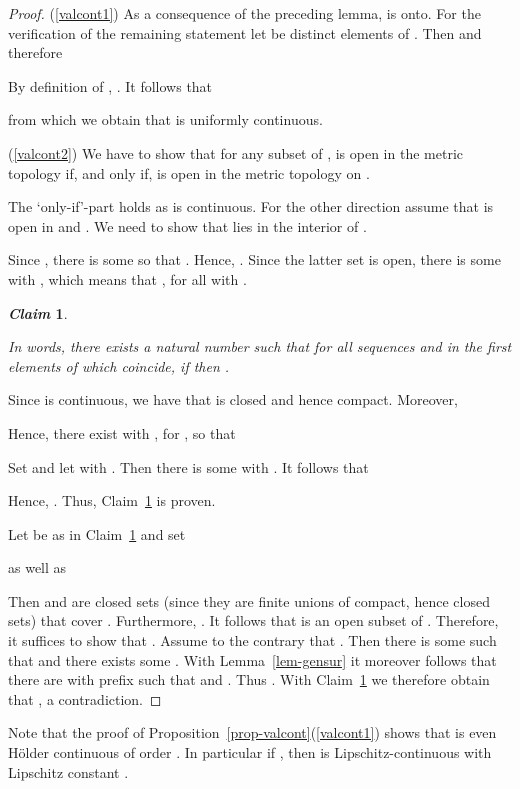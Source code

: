 \documentclass[microtype]{jloganal}
\newtheorem{claim}{\it Claim}
\theoremstyle{plain}
\theoremstyle{definition}
\begin{document}
\begin{proof}
(\ref{valcont1}) As a consequence of the preceding lemma,  is onto. For the verification of the remaining statement let  be distinct elements of . Then  and therefore 

By definition of , . It follows that

from which we obtain that  is uniformly continuous.

(\ref{valcont2}) We have to show that for any subset  of ,  is open in the metric topology if, and only if,  is open in the metric topology on . 

The `only-if'-part holds as  is continuous. For the other direction assume that  is open in  and . We need to show that  lies in the interior of .

Since , there is some  so that . Hence, . Since the latter set is open, there is some  with , which means that , for all  with .

\begin{claim}
\label{cl-qtop-1}


In words, there exists a natural number  such that for all sequences  and  in  the first  elements of which coincide, if  then .
\end{claim}

Since  is continuous, we have that  is closed and hence compact. Moreover,

Hence, there exist  with , for , so that

Set  and let  with . Then there is some  with . It follows that

Hence, . Thus, Claim~\ref{cl-qtop-1} is proven.

Let  be as in Claim~\ref{cl-qtop-1} and set 

as well as 

Then  and  are closed sets (since they are finite unions
of compact, hence closed sets) that cover . Furthermore, .
It follows that  is an open subset of . Therefore, it suffices
to show that .
Assume to the contrary that . Then there is some 
such that  and there exists some 
. 
With Lemma~\ref{lem-gensur} it moreover follows that there are 
 with prefix  such that 
 and . 
Thus . With Claim~\ref{cl-qtop-1} 
we therefore obtain  that , a contradiction.
\end{proof}

Note that the proof of Proposition~\ref{prop-valcont}(\ref{valcont1}) shows that 
 is even H\"older continuous of order . 
In particular if , then  is Lipschitz-continuous 
with Lipschitz constant .
\end{document}
